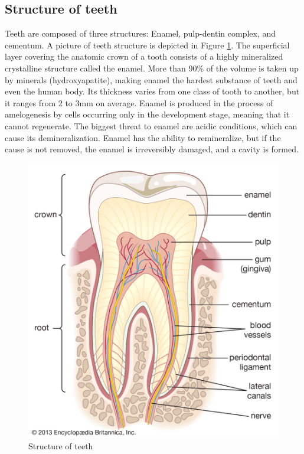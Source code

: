 \subsection{Structure of teeth}
Teeth are composed of three structures: Enamel, pulp-dentin complex, and cementum. A picture of teeth structure is depicted in Figure \ref{fig:structure_teeth}.
The superficial layer covering the anatomic crown of a tooth consists of a highly mineralized crystalline structure called the enamel. More than 90\% of the volume is taken up by minerals (hydroxyapatite), making enamel the hardest substance of teeth and even the human body. Its thickness varies from one class of tooth to another, but it ranges from 2 to 3mm on average. Enamel is produced in the process of amelogenesis by cells occurring only in the development stage, meaning that it cannot regenerate. The biggest threat to enamel are acidic conditions, which can cause its demineralization. Enamel has the ability to remineralize, but if the cause is not removed, the enamel is irreversibly damaged, and a cavity is formed.
\begin{figure}
    \centering
    \includegraphics[width=0.7\linewidth]{images/tooth_structure.jpg}
    \caption{Structure of teeth}
    \label{fig:structure_teeth}
\end{figure}
